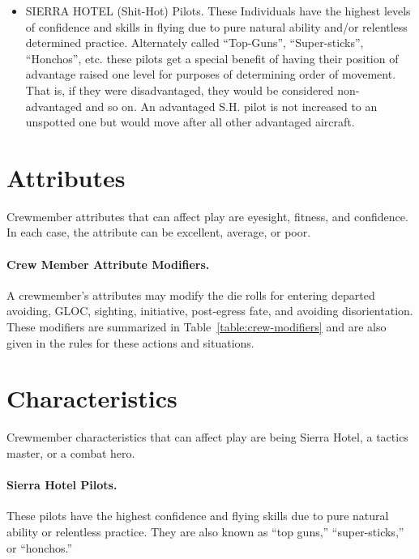 \begin{advancedrules}
{\begin{itemize}
    \item SIERRA HOTEL (Shit-Hot) Pilots. These Individuals have the highest levels of confidence and skills in flying due to pure natural ability and/or relentless determined practice. Alternately called “Top-Guns”, “Super-sticks”, “Honchos”, etc. these pilots get a special benefit of having their position of advantage raised one level for purposes of determining order of movement. That is, if they were disadvantaged, they would be considered non-advantaged and so on. An advantaged S.H. pilot is not increased to an unspotted one but would move after all other advantaged aircraft. 

\end{itemize}
}{
\section{Attributes}
\label{rule:crew-attributes}

Crewmember attributes that can affect play are eyesight, fitness, and confidence. In each case, the attribute can be excellent, average, or poor.

\paragraph{Crew Member Attribute Modifiers.} A crewmember's attributes may modify the die rolls for entering departed avoiding, GLOC, sighting, initiative, post-egress fate, and avoiding disorientation. These modifiers are summarized in Table~\ref{table:crew-modifiers} and are also given in the rules for these actions and situations.

\section{Characteristics}
\label{rule:crew-characteristics}

Crewmember characteristics that can affect play are being Sierra Hotel, a tactics master, or a combat hero.

\paragraph{Sierra Hotel Pilots.} These pilots have the highest confidence and flying skills due to pure natural ability or relentless practice. They are also known as “top guns,” “super-sticks,” or “honchos.” 

}
\end{advancedrules}
